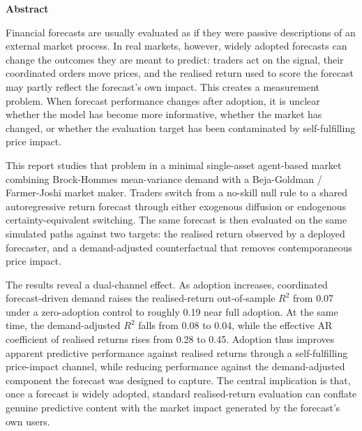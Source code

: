 \documentclass[12pt]{article}
\begin{document}
\begin{center}{\Large\bfseries\color{accent} Abstract\par}\end{center}
\vspace{0.8em}
\begin{center}
\begin{minipage}{0.9\textwidth}
\justifying
\noindent Financial forecasts are usually evaluated as if they were passive descriptions of an external market process. In real markets, however, widely adopted forecasts can change the outcomes they are meant to predict: traders act on the signal, their coordinated orders move prices, and the realised return used to score the forecast may partly reflect the forecast's own impact. This creates a measurement problem. When forecast performance changes after adoption, it is unclear whether the model has become more informative, whether the market has changed, or whether the evaluation target has been contaminated by self-fulfilling price impact.

This report studies that problem in a minimal single-asset agent-based market combining Brock-Hommes mean-variance demand with a Beja-Goldman / Farmer-Joshi market maker. Traders switch from a no-skill null rule to a shared autoregressive return forecast through either exogenous diffusion or endogenous certainty-equivalent switching. The same forecast is then evaluated on the same simulated paths against two targets: the realised return observed by a deployed forecaster, and a demand-adjusted counterfactual that removes contemporaneous price impact.

The results reveal a dual-channel effect. As adoption increases, coordinated forecast-driven demand raises the realised-return out-of-sample $R^{2}$ from 0.07 under a zero-adoption control to roughly 0.19 near full adoption. At the same time, the demand-adjusted $R^{2}$ falls from 0.08 to 0.04, while the effective AR coefficient of realised returns rises from 0.28 to 0.45. Adoption thus improves apparent predictive performance against realised returns through a self-fulfilling price-impact channel, while reducing performance against the demand-adjusted component the forecast was designed to capture. The central implication is that, once a forecast is widely adopted, standard realised-return evaluation can conflate genuine predictive content with the market impact generated by the forecast's own users.
\end{minipage}
\end{center}
\clearpage
\end{document}
